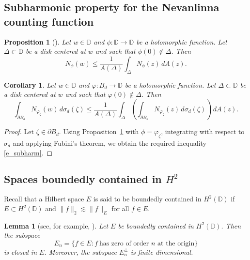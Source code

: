 \documentclass{amsart}
\numberwithin{equation}{section}
\newtheorem{proposition}[theorem]{Proposition}
\newtheorem{corollary}[theorem]{Corollary}
\newtheorem{lemma}[theorem]{Lemma}
\theoremstyle{definition}
\newcommand{\bd}{{B_d}}
\newcommand{\neva}{N}
\newcommand{\aream}{A}
\newcommand{\meal}{\sigma_d}
\newcommand{\za}{\zeta}
\newcommand{\ph}{\varphi}
\newcommand{\Dbb}{\mathbb D}
\newcommand{\spd}{\partial B_d}
\begin{document}
\subsection{Subharmonic property for the Nevanlinna counting function}

\begin{proposition}[{\cite[Section 4.6]{ShJoel87}}]\label{p_subharm}
Let $w\in\Dbb$ and $\phi: \Dbb\to\Dbb$ be a holomorphic function.
Let $\Delta\subset \Dbb$ be a disk centered at $w$ and such that $\phi(0)\notin \Delta$.
Then
\begin{equation}\label{e_subharm_1}
\neva_{\phi}(w) \le \frac{1}{\aream(\Delta)}\int_{\Delta} \neva_\phi(z)\, d\aream(z).
\end{equation}
\end{proposition}

\begin{corollary}\label{c_subharm}
Let $w\in\Dbb$ and $\ph: \bd\to\Dbb$ be a holomorphic function.
Let $\Delta\subset\Dbb$ be a disk centered at $w$ and such that $\ph(0)\notin \Delta$.
Then
\begin{equation}\label{e_subharm}
\int_{\spd} \neva_{\ph_\za}(w)\,d\meal(\za) \le \frac{1}{\aream(\Delta)}\int_{\Delta} 
\left(\int_{\spd} \neva_{\ph_\za}(z)\,  d\meal(\za) \right)\, d\aream(z).
\end{equation}
\end{corollary}
\begin{proof}
Let $\za\in \spd$.
Using Proposition~\ref{p_subharm} with $\phi = \ph_\za$,
integrating with respect to $\meal$ and applying Fubini's theorem, we obtain the required
inequality \eqref{e_subharm}.
\end{proof}

\subsection{Spaces boundedly contained in $H^2$}
Recall
that a Hilbert space $E$ is said to be boundedly contained in $H^2(\Dbb)$ if 
$E \subset H^2(\Dbb)$ and $\|f\|_2 \lesssim \|f\|_E$
for all $f \in E$.

\begin{lemma}[see, for example, {\cite[Lemma 10]{FKM19}}]\label{l_10}
Let $E$ be boundedly contained in $H^2(\Dbb)$. Then the subspace
\[
E_n = \{f \in E: f \ \textrm{has zero of order $n$ at the origin} \}
\]
is closed in $E$. Moreover, the subspace $E_n^\bot$ is finite dimensional.
\end{lemma}
\end{document}
